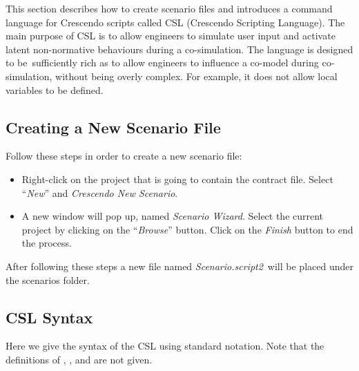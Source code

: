 \documentclass{crescendorepchap}
\begin{document}
This section describes how to create scenario files and introduces
a command language for Crescendo scripts called CSL (Crescendo
Scripting Language). The main purpose of CSL is to allow engineers to
simulate user input and activate latent non-normative behaviours during
a co-simulation. The language is designed to be~sufficiently rich as to
allow engineers to influence a co-model during co-simulation, without
being overly complex. For example, it does not allow local variables to
be defined.

\subsection{Creating a New Scenario File}

Follow these steps in order to create a new scenario file:

\begin{itemize}
\item
  Right-click on the project that is going to contain the contract file.
  Select ``\emph{New}'' and \emph{Crescendo New Scenario}.
\item
  A new window will pop up, named \emph{Scenario Wizard}. Select the
  current project by clicking on the ``\emph{Browse}'' button. Click on the
  \emph{Finish} button to end the process.
\end{itemize}

After following these steps a new file named \emph{Scenario.script2}~will
be placed under the scenarios folder. 



\subsection{CSL Syntax}

Here we give the syntax of the CSL using standard notation.  Note that
the definitions of , , and 
are not given.
\end{document}
